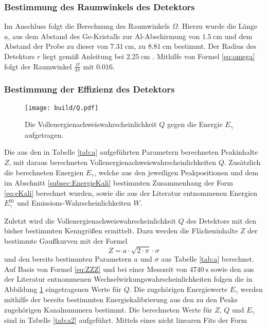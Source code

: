 \subsubsection{Bestimmung des Raumwinkels des Detektors}
Im Anschluss folgt die Berechnung des Raumwinkels $\Omega$. Hierzu wurde die Länge $a$, aus dem Abstand des Ge-Kristalls zur Al-Abschirmung von $\SI{1.5}{\centi\meter}$ und dem Abstand der Probe zu dieser von $\SI{7.31}{\centi\meter}$, zu $\SI{8.81}{\centi\meter}$ bestimmt. Der Radius des Detektors $r$ liegt gemäß Anleitung bei $\SI{2.25}{\centi\meter}$ \cite{V18}. Mithilfe von Formel \eqref{eq:omega} folgt der Raumwinkel $\frac{\Omega}{4 \pi}$ mit $\num{0.016}$.


\subsubsection{Bestimmung der Effizienz des Detektors}
\begin{figure}
	\centering
	\texttt{[image: build/Q.pdf]}
	\caption{Die Vollenergienachweiswahrscheinlichkeit $Q$ gegen die Energie $E_\gamma$ aufgetragen.}
	\label{fig:Q}
\end{figure}
\begin{table}
	\centering
	\caption{Die aus den in Tabelle \ref{tab:a} aufgeführten Parametern berechneten Peakinhalte $Z$, mit daraus berechneten Vollenergienachweiswahrscheinlichkeiten $Q$. Zusätzlich die berechneten Energien $E_\gamma$, welche aus den jeweiligen Peakpositionen und dem im Abschnitt \ref{subsec:EnergieKali} bestimmten Zusammenhang der Form \eqref{eq:eKali} berechnet wurden, sowie die aus der Literatur entnommenen Energien $E_\gamma^\text{lit}$ und Emissions-Wahrscheinlichkeiten $W$.}
	
\end{table}
Zuletzt wird die Vollenergienachweiswahrscheinlichkeit $Q$ des Detektors mit den bisher bestimmten Kenngrößen ermittelt. Dazu werden die Flächeninhalte $Z$ der bestimmte Gaußkurven mit der Formel 
\begin{equation}
    Z = a \cdot \sqrt{2 \cdot \pi} \cdot \sigma \label{eq:flach}
\end{equation}
und den bereits bestimmten Parametern $a$ und $\sigma$ aus Tabelle \ref{tab:a} berechnet. Auf Basis von Formel \eqref{eq:ZZZ} und bei einer Messzeit von $\SI{4740}{\second}$ sowie den aus der Literatur entnommenen Wechselwirkungswahrscheinlichkeiten \cite{MARTIN20131497} folgen die in Abbildung \ref{fig:Q} eingetragenen Werte für $Q$. Die zugehörigen Energiewerte $E_\gamma$ werden mithilfe der bereits bestimmten Energiekalibrierung aus den zu den Peaks zugehörigen Kanalnummern bestimmt. Die berechneten Werte für $Z$, $Q$ und $E_\gamma$ sind in Tabelle \ref{tab:a2} aufgeführt. Mittels eines nicht linearen Fits der Form 
